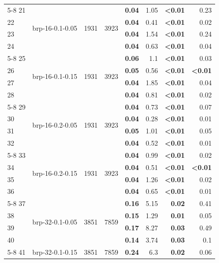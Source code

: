 \begin{longtable}{lrr@{\hskip 12pt}r@{\hskip 12pt}r@{\hskip 12pt}r@{\hskip 12pt}r@{\hskip 12pt}r}
\cmidrule{5-8}
21 & \multirow{4}{*}{brp-16-0.1-0.05} & \multirow{4}{*}{1931} & \multirow{4}{*}{3923} & \textbf{0.04} & 1.05 & \textbf{<0.01} & 0.23 \\
22 &  &  &  & \textbf{0.04} & 0.41 & \textbf{<0.01} & 0.02 \\
23 &  &  &  & \textbf{0.04} & 1.54 & \textbf{<0.01} & 0.24 \\
24 &  &  &  & \textbf{0.04} & 0.63 & \textbf{<0.01} & 0.04 \\
\cmidrule{5-8}
25 & \multirow{4}{*}{brp-16-0.1-0.15} & \multirow{4}{*}{1931} & \multirow{4}{*}{3923} & \textbf{0.06} & 1.1 & \textbf{<0.01} & 0.03 \\
26 &  &  &  & \textbf{0.05} & 0.56 & \textbf{<0.01} & \textbf{<0.01} \\
27 &  &  &  & \textbf{0.04} & 1.85 & \textbf{<0.01} & 0.04 \\
28 &  &  &  & \textbf{0.04} & 0.81 & \textbf{<0.01} & 0.02 \\
\cmidrule{5-8}
29 & \multirow{4}{*}{brp-16-0.2-0.05} & \multirow{4}{*}{1931} & \multirow{4}{*}{3923} & \textbf{0.04} & 0.73 & \textbf{<0.01} & 0.07 \\
30 &  &  &  & \textbf{0.04} & 0.28 & \textbf{<0.01} & 0.01 \\
31 &  &  &  & \textbf{0.05} & 1.01 & \textbf{<0.01} & 0.05 \\
32 &  &  &  & \textbf{0.04} & 0.52 & \textbf{<0.01} & 0.01 \\
\cmidrule{5-8}
33 & \multirow{4}{*}{brp-16-0.2-0.15} & \multirow{4}{*}{1931} & \multirow{4}{*}{3923} & \textbf{0.04} & 0.99 & \textbf{<0.01} & 0.02 \\
34 &  &  &  & \textbf{0.04} & 0.51 & \textbf{<0.01} & \textbf{<0.01} \\
35 &  &  &  & \textbf{0.04} & 1.26 & \textbf{<0.01} & 0.02 \\
36 &  &  &  & \textbf{0.04} & 0.65 & \textbf{<0.01} & 0.01 \\
\cmidrule{5-8}
37 & \multirow{4}{*}{brp-32-0.1-0.05} & \multirow{4}{*}{3851} & \multirow{4}{*}{7859} & \textbf{0.16} & 5.15 & \textbf{0.02} & 0.41 \\
38 &  &  &  & \textbf{0.15} & 1.29 & \textbf{0.01} & 0.05 \\
39 &  &  &  & \textbf{0.17} & 8.27 & \textbf{0.03} & 0.49 \\
40 &  &  &  & \textbf{0.14} & 3.74 & \textbf{0.03} & 0.1 \\
\cmidrule{5-8}
41 & \multirow{4}{*}{brp-32-0.1-0.15} & \multirow{4}{*}{3851} & \multirow{4}{*}{7859} & \textbf{0.24} & 6.3 & \textbf{0.02} & 0.06 \\

\end{longtable}

